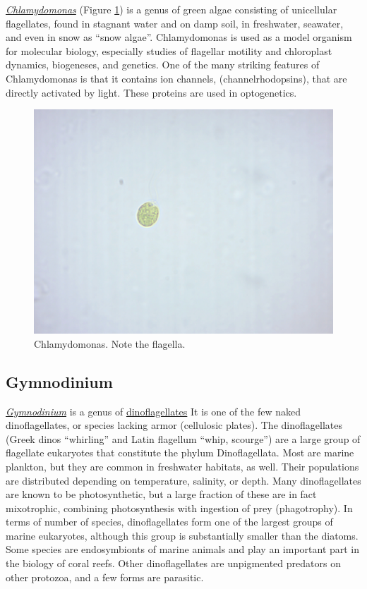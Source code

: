\href{https://en.wikipedia.org/wiki/Chlamydomonas}{\emph{Chlamydomonas}}
(Figure \ref{fig:chlamydomonaslive}) is a genus of green algae
consisting of unicellular flagellates, found in stagnant water and on
damp soil, in freshwater, seawater, and even in snow as ``snow algae''.
Chlamydomonas is used as a model organism for molecular biology,
especially studies of flagellar motility and chloroplast dynamics,
biogeneses, and genetics. One of the many striking features of
Chlamydomonas is that it contains ion channels, (channelrhodopsins),
that are directly activated by light. These proteins are used in
optogenetics.

\begin{figure}

{\centering \includegraphics[width=0.7\linewidth]{./figures/protists/chlamydomonas_live}

}

\caption{Chlamydomonas. Note the flagella.}\label{fig:chlamydomonaslive}
\end{figure}

\subsection{Gymnodinium}\label{gymnodinium}

\href{https://en.wikipedia.org/wiki/Gymnodinium}{\emph{Gymnodinium}} is
a genus of
\href{https://en.wikipedia.org/wiki/Dinoflagellate}{dinoflagellates} It
is one of the few naked dinoflagellates, or species lacking armor
(cellulosic plates). The dinoflagellates (Greek dinos ``whirling'' and
Latin flagellum ``whip, scourge'') are a large group of flagellate
eukaryotes that constitute the phylum Dinoflagellata. Most are marine
plankton, but they are common in freshwater habitats, as well. Their
populations are distributed depending on temperature, salinity, or
depth. Many dinoflagellates are known to be photosynthetic, but a large
fraction of these are in fact mixotrophic, combining photosynthesis with
ingestion of prey (phagotrophy). In terms of number of species,
dinoflagellates form one of the largest groups of marine eukaryotes,
although this group is substantially smaller than the diatoms. Some
species are endosymbionts of marine animals and play an important part
in the biology of coral reefs. Other dinoflagellates are unpigmented
predators on other protozoa, and a few forms are parasitic.

